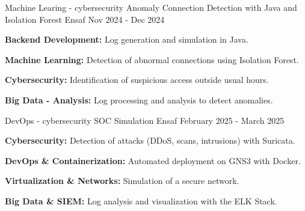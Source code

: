 

\begin{cventries}

  \cventry
    {Machine Learing - cybersecurity} 
    {Anomaly Connection Detection with Java and Isolation Forest} %
    {Ensaf} %
    {Nov 2024 - Dec  2024} %
    {
      \begin{cvitems} %
        \item {
         \textbf{Backend Development:}
         Log generation and simulation in Java.}
        \item {
        \textbf{Machine Learning:}
         Detection of abnormal connections using Isolation Forest.}
         \item {
        \textbf{Cybersecurity:}
         Identification of suspicious access outside usual hours.}
         \item {
        \textbf{Big Data - Analysis:}
        Log processing and analysis to detect anomalies.}
      \end{cvitems}
    }

 \cventry
    {DevOps  - cybersecurity} 
    {SOC Simulation} %
    {Ensaf} %
    {February 2025 - March 2025} %
    {
      \begin{cvitems} %
        \item {
         \textbf{Cybersecurity:}
         Detection of attacks (DDoS, scans, intrusions) with Suricata.}
        \item {
        \textbf{DevOps \& Containerization:}
         Automated deployment on GNS3 with Docker.}
         \item {
        \textbf{Virtualization \& Networks:}
         Simulation of a secure network.}
         \item {
        \textbf{Big Data \& SIEM:}
         Log analysis and visualization with the ELK Stack.}
      \end{cvitems}
    }

\end{cventries}

